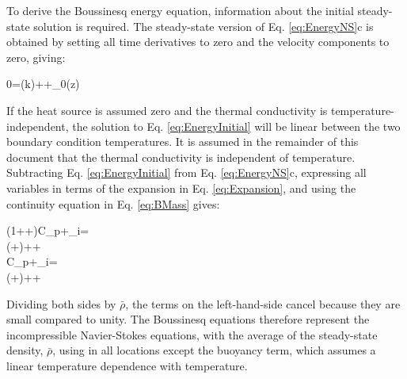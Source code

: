 \documentclass[10pt]{article}
\numberwithin{equation}{section} %
\begin{document}
To derive the Boussinesq energy equation, information about the initial steady-state solution is required. The steady-state version of Eq. \eqref{eq:EnergyNS}c is obtained by setting all time derivatives to zero and the velocity components to zero, giving:

\beq
\label{eq:EnergyInitial}
0=\left(k\right)++_0(z)
\eeq

If the heat source is assumed zero and the thermal conductivity is temperature-independent, the solution to Eq. \eqref{eq:EnergyInitial} will be linear between the two boundary condition temperatures. It is assumed in the remainder of this document that the thermal conductivity is independent of temperature. Subtracting Eq. \eqref{eq:EnergyInitial} from Eq. \eqref{eq:EnergyNS}c, expressing all variables in terms of the expansion in Eq. \eqref{eq:Expansion}, and using the continuity equation in Eq. \eqref{eq:BMass} gives:

\beqa
\label{eq:BEnergy}
\left(1++\right)C_p\left\lbrack{}+_i\right\rbrack=\hspace{2cm}\\
\frac{\mu}{\bar{\rho}}\left(+\right)++\\
C_p\left\lbrack{}+_i\right\rbrack=\hspace{2cm}\\
\frac{\mu}{\bar{\rho}}\left(+\right)++\\
\eeqa

Dividing both sides by \(\bar{\rho}\), the terms on the left-hand-side cancel because they are small compared to unity. The Boussinesq equations therefore represent the incompressible Navier-Stokes equations, with the average of the steady-state density, \(\bar{\rho}\), using in all locations except the buoyancy term, which assumes a linear temperature dependence with temperature.
\end{document}
